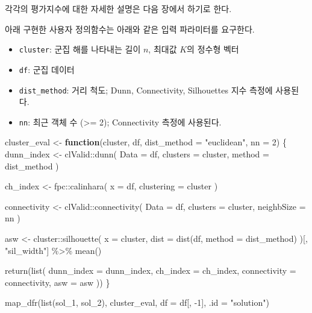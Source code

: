 \documentclass[
]{book}
\newenvironment{Shaded}{\begin{snugshade}}{\end{snugshade}}
\newcommand{\AttributeTok}[1]{\textcolor[rgb]{0.77,0.63,0.00}{#1}}
\newcommand{\ControlFlowTok}[1]{\textcolor[rgb]{0.13,0.29,0.53}{\textbf{#1}}}
\newcommand{\DecValTok}[1]{\textcolor[rgb]{0.00,0.00,0.81}{#1}}
\newcommand{\FunctionTok}[1]{\textcolor[rgb]{0.00,0.00,0.00}{#1}}
\newcommand{\NormalTok}[1]{#1}
\newcommand{\OtherTok}[1]{\textcolor[rgb]{0.56,0.35,0.01}{#1}}
\newcommand{\SpecialCharTok}[1]{\textcolor[rgb]{0.00,0.00,0.00}{#1}}
\newcommand{\StringTok}[1]{\textcolor[rgb]{0.31,0.60,0.02}{#1}}
\providecommand{\tightlist}{%
  \setlength{\itemsep}{0pt}\setlength{\parskip}{0pt}}
\begin{document}
각각의 평가지수에 대한 자세한 설명은 다음 장에서 하기로 한다.

아래 구현한 사용자 정의함수는 아래와 같은 입력 파라미터를 요구한다.

\begin{itemize}
\tightlist
\item
  \texttt{cluster}: 군집 해를 나타내는 길이 \(n\), 최대값 \(K\)의 정수형 벡터
\item
  \texttt{df}: 군집 데이터
\item
  \texttt{dist\_method}: 거리 척도; Dunn, Connectivity, Silhouettes 지수 측정에 사용된다.
\item
  \texttt{nn}: 최근 객체 수 (\textgreater= 2); Connectivity 측정에 사용된다.
\end{itemize}

\begin{Shaded}
\begin{Highlighting}[]
\NormalTok{cluster\_eval }\OtherTok{\textless{}{-}} \ControlFlowTok{function}\NormalTok{(cluster, df, }\AttributeTok{dist\_method =} \StringTok{"euclidean"}\NormalTok{, }\AttributeTok{nn =} \DecValTok{2}\NormalTok{) \{}
\NormalTok{  dunn\_index }\OtherTok{\textless{}{-}}\NormalTok{ clValid}\SpecialCharTok{::}\FunctionTok{dunn}\NormalTok{(}
    \AttributeTok{Data =}\NormalTok{ df, }
    \AttributeTok{clusters =}\NormalTok{ cluster, }
    \AttributeTok{method =}\NormalTok{ dist\_method}
\NormalTok{  )}
  
\NormalTok{  ch\_index }\OtherTok{\textless{}{-}}\NormalTok{ fpc}\SpecialCharTok{::}\FunctionTok{calinhara}\NormalTok{(}
    \AttributeTok{x =}\NormalTok{ df, }
    \AttributeTok{clustering =}\NormalTok{ cluster}
\NormalTok{  )}
  
\NormalTok{  connectivity }\OtherTok{\textless{}{-}}\NormalTok{ clValid}\SpecialCharTok{::}\FunctionTok{connectivity}\NormalTok{(}
    \AttributeTok{Data =}\NormalTok{ df, }
    \AttributeTok{clusters =}\NormalTok{ cluster, }
    \AttributeTok{neighbSize =}\NormalTok{ nn}
\NormalTok{  )}
  
\NormalTok{  asw }\OtherTok{\textless{}{-}}\NormalTok{ cluster}\SpecialCharTok{::}\FunctionTok{silhouette}\NormalTok{(}
    \AttributeTok{x =}\NormalTok{ cluster, }
    \AttributeTok{dist =} \FunctionTok{dist}\NormalTok{(df, }\AttributeTok{method =}\NormalTok{ dist\_method)}
\NormalTok{  )[, }\StringTok{"sil\_width"}\NormalTok{] }\SpecialCharTok{\%\textgreater{}\%} \FunctionTok{mean}\NormalTok{()}
  
  \FunctionTok{return}\NormalTok{(}\FunctionTok{list}\NormalTok{(}
    \AttributeTok{dunn\_index =}\NormalTok{ dunn\_index,}
    \AttributeTok{ch\_index =}\NormalTok{ ch\_index,}
    \AttributeTok{connectivity =}\NormalTok{ connectivity,}
    \AttributeTok{asw =}\NormalTok{ asw}
\NormalTok{  ))}
\NormalTok{\}}

\FunctionTok{map\_dfr}\NormalTok{(}\FunctionTok{list}\NormalTok{(sol\_1, sol\_2), cluster\_eval, }\AttributeTok{df =}\NormalTok{ df[, }\SpecialCharTok{{-}}\DecValTok{1}\NormalTok{], }\AttributeTok{.id =} \StringTok{"solution"}\NormalTok{)}
\end{Highlighting}
\end{Shaded}
\end{document}
